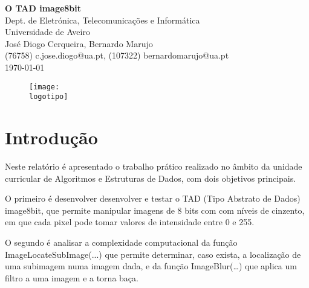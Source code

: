 \documentclass{report}
\begin{document}
%
\def\titulo{O TAD image8bit}
\def\data{\today}
\def\autores{José Diogo Cerqueira, Bernardo Marujo}
\def\autorescontactos{(76758) c.jose.diogo@ua.pt, (107322) bernardomarujo@ua.pt}
\def\departamento{Dept. de Eletrónica, Telecomunicações e Informática}
\def\empresa{Universidade de Aveiro}
\def\logotipo{ua.pdf}
%
%

%
%
\begin{titlepage}

\begin{center}
%
\vspace{50mm}
%
{\Huge\textbf{\titulo}}\\
{\Large \departamento\\ \empresa}\\
%
\vspace{10mm}
%
%
{\LARGE \autores\\ \autorescontactos} \\ 
%
\vspace{10mm}
%
\data
%
\vspace{20mm}
%
\begin{figure}[h]
\center
\texttt{[image: \\logotipo]}
\end{figure}
%
\end{center}
%
\end{titlepage}


\tableofcontents



\clearpage
{}


\chapter{Introdução}

Neste relatório é apresentado o trabalho prático realizado no âmbito da unidade curricular de Algoritmos e Estruturas de Dados, com dois objetivos principais.
\par
O primeiro é desenvolver desenvolver e testar o TAD (Tipo Abstrato de Dados) image8bit, que permite manipular imagens de 8 bits com com níveis de cinzento, em que cada pixel pode tomar valores de intensidade entre 0 e 255.
\par
O segundo é analisar a complexidade computacional da função ImageLocateSubImage(...) que permite determinar, caso exista, a localização de uma subimagem numa imagem dada, e da função ImageBlur(…) que aplica um filtro a uma imagem e a torna baça.
\end{document}
